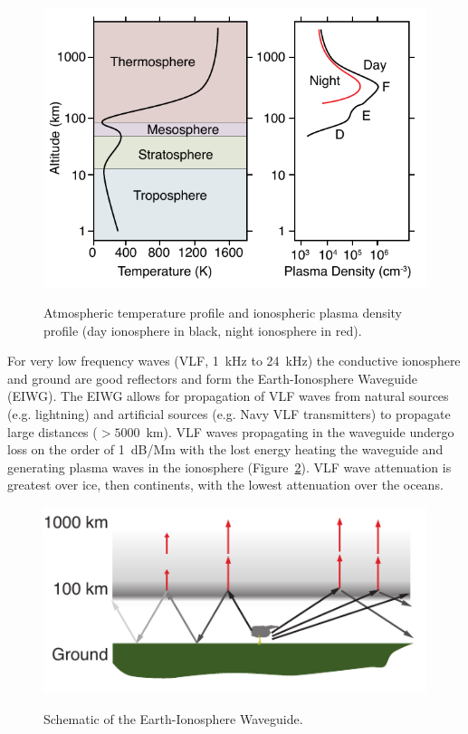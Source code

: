 \begin{figure}[ht!]
	\centering
	\includegraphics[scale=1]{Introduction/Figures/ionosphere.pdf}\\
	\caption{Atmospheric temperature profile and ionospheric plasma density profile (day ionosphere in black, night ionosphere in red).
		     }
	\label{intro:fig:ionosphere}
\end{figure}

For very low frequency waves (VLF, 1~kHz to 24~kHz) the conductive ionosphere and ground are good reflectors and form the Earth-Ionosphere Waveguide (EIWG).
The EIWG allows for propagation of VLF waves from natural sources (e.g. lightning) and artificial sources (e.g. Navy VLF transmitters) to propagate large distances ($>5000$~km).
VLF waves propagating in the waveguide undergo loss on the order of 1~dB/Mm with the lost energy heating the waveguide and generating plasma waves in the ionosphere (Figure~\ref{intro:fig:eiwg}).
VLF wave attenuation is greatest over ice, then continents, with the lowest attenuation over the oceans.

\begin{figure}[ht!]
	\centering
	\includegraphics[scale=1]{Introduction/Figures/eiwg.pdf}\\
	\caption{Schematic of the Earth-Ionosphere Waveguide.}
	\label{intro:fig:eiwg}
\end{figure}

